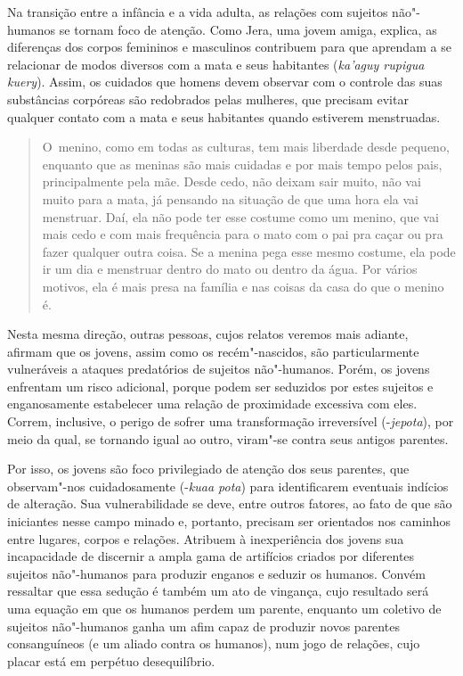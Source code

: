 Na transição entre a infância e a vida adulta, as relações com sujeitos
não"-humanos se tornam foco de atenção. Como Jera, uma jovem amiga,
explica, as diferenças dos corpos femininos e masculinos contribuem
para que aprendam a se relacionar de modos diversos com a mata e seus
habitantes (\emph{ka’aguy rupigua kuery}). Assim, os cuidados que homens devem
observar com o controle das suas substâncias corpóreas são redobrados
pelas mulheres, que precisam evitar qualquer contato com a mata e seus
habitantes quando estiverem menstruadas. 

\begin{quote}
\noindent
O~menino, como em todas as culturas, tem mais liberdade desde pequeno,
enquanto que as meninas são mais cuidadas e por mais tempo pelos pais,
principalmente pela mãe. Desde cedo, não deixam sair muito, não vai
muito para a mata, já pensando na situação de que uma hora ela vai
menstruar. Daí, ela não pode ter esse costume como um menino, que vai
mais cedo e com mais frequência para o mato com o pai pra caçar ou pra
fazer qualquer outra coisa. Se a menina pega esse mesmo costume, ela
pode ir um dia e menstruar dentro do mato ou dentro da água. Por vários
motivos, ela é mais presa na família e nas coisas da casa do que o
menino é.
\end{quote}

Nesta mesma direção, outras pessoas, cujos relatos veremos mais adiante,
afirmam que os jovens, assim como os recém"-nascidos, são
particularmente vulneráveis a ataques predatórios de sujeitos
não"-humanos. Porém, os jovens enfrentam um risco adicional, porque
podem ser seduzidos por estes sujeitos e enganosamente estabelecer uma
relação de proximidade excessiva com eles. Correm, inclusive, o perigo
de sofrer uma transformação irreversível (-\emph{jepota}), por meio da qual,
se tornando igual ao outro, viram"-se contra seus antigos parentes.

Por isso, os jovens são foco privilegiado de atenção dos seus parentes,
que observam"-nos cuidadosamente (-\emph{kuaa pota}) para identificarem
eventuais indícios de alteração. Sua vulnerabilidade se deve, entre
outros fatores, ao fato de que são iniciantes nesse campo minado e,
portanto, precisam ser orientados nos caminhos entre lugares, corpos e
relações. Atribuem à inexperiência dos jovens sua incapacidade de
discernir a ampla gama de artifícios criados por diferentes sujeitos
não"-humanos para produzir enganos e seduzir os humanos. Convém
ressaltar que essa sedução é também um ato de vingança, cujo resultado
será uma equação em que os humanos perdem um parente, enquanto um
coletivo de sujeitos não"-humanos ganha um afim capaz de produzir novos
parentes consanguíneos (e um aliado contra os humanos), num jogo de
relações, cujo placar está em perpétuo desequilíbrio.

